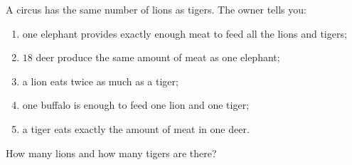 A circus has the same number of lions as tigers. The owner tells you:
\begin{enumerate}
\item[(1)] one elephant provides exactly enough meat to feed all the lions and tigers;
\item[(2)] $18$ deer produce the same amount of meat as one elephant;
\item[(3)] a lion eats twice as much as a tiger;
\item[(4)] one buffalo is enough to feed one lion and one tiger;
\item[(5)] a tiger eats exactly the amount of meat in one deer.
\end{enumerate}
How many lions and how many tigers are there?
